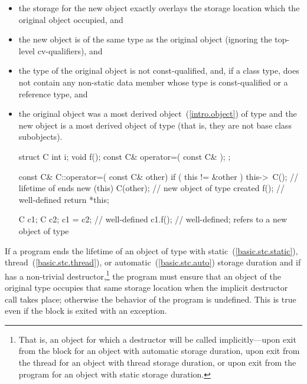 \begin{itemize}
\item the storage for the new object exactly overlays the storage
location which the original object occupied, and

\item the new object is of the same type as the original object
(ignoring the top-level cv-qualifiers), and

\item the type of the original object is not const-qualified, and, if a
class type, does not contain any non-static data member whose type is
const-qualified or a reference type, and

\item the original object was a most derived object~(\ref{intro.object})
of type  and the new object is a most derived object of type
 (that is, they are not base class subobjects). \enterexample

\begin{codeblock}
struct C {
  int i;
  void f();
  const C& operator=( const C& );
};

const C& C::operator=( const C& other) {
  if ( this != &other ) {
    this->~C();                 // lifetime of  ends
    new (this) C(other);        // new object of type  created
    f();                        // well-defined
  }
  return *this;
}

C c1;
C c2;
c1 = c2;                        // well-defined
c1.f();                         // well-defined;  refers to a new object of type 
\end{codeblock}

\exitexample
\end{itemize}

\pnum
If a program ends the lifetime of an object of type  with
static~(\ref{basic.stc.static}), thread~(\ref{basic.stc.thread}),
or automatic~(\ref{basic.stc.auto})
storage duration and if  has a non-trivial destructor,\footnote{That
is, an object for which a destructor will be called
implicitly---upon exit from the block for an object with
automatic storage duration, upon exit from the thread for an object with
thread storage duration, or upon exit from the program for an object
with static storage duration.}
the program must ensure that an object of the original type occupies
that same storage location when the implicit destructor call takes
place; otherwise the behavior of the program is undefined. This is true
even if the block is exited with an exception. \enterexample

